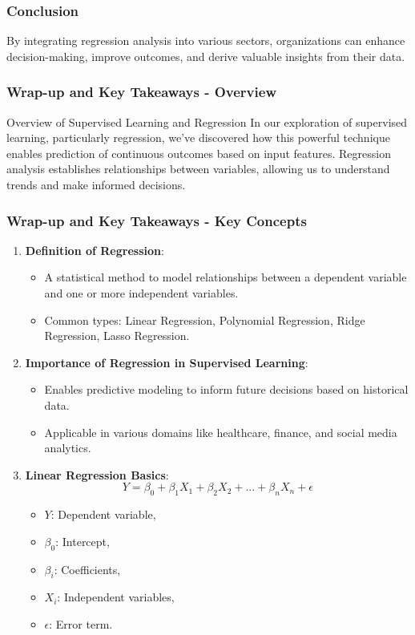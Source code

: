 \documentclass[aspectratio=169]{beamer}
\begin{document}
\begin{frame}[fragile]
  \frametitle{Conclusion}
  By integrating regression analysis into various sectors, organizations can enhance decision-making, improve outcomes, and derive valuable insights from their data.
\end{frame}

\begin{frame}[fragile]
  \frametitle{Wrap-up and Key Takeaways - Overview}
  \begin{block}{Overview of Supervised Learning and Regression}
    In our exploration of supervised learning, particularly regression, we've discovered how this powerful technique enables prediction of continuous outcomes based on input features. 
    Regression analysis establishes relationships between variables, allowing us to understand trends and make informed decisions.
  \end{block}
\end{frame}

\begin{frame}[fragile]
  \frametitle{Wrap-up and Key Takeaways - Key Concepts}
  \begin{enumerate}
    \item \textbf{Definition of Regression}:
      \begin{itemize}
        \item A statistical method to model relationships between a dependent variable and one or more independent variables.
        \item Common types: Linear Regression, Polynomial Regression, Ridge Regression, Lasso Regression.
      \end{itemize}
    
    \item \textbf{Importance of Regression in Supervised Learning}:
      \begin{itemize}
        \item Enables predictive modeling to inform future decisions based on historical data.
        \item Applicable in various domains like healthcare, finance, and social media analytics.
      \end{itemize}
  
    \item \textbf{Linear Regression Basics}:
      \begin{equation}
        Y = \beta_0 + \beta_1X_1 + \beta_2X_2 + ... + \beta_nX_n + \epsilon
      \end{equation}
      \begin{itemize}
        \item \(Y\): Dependent variable, 
        \item \(\beta_0\): Intercept, 
        \item \(\beta_i\): Coefficients,
        \item \(X_i\): Independent variables, 
        \item \(\epsilon\): Error term.
      \end{itemize}
  \end{enumerate}
\end{frame}
\end{document}
